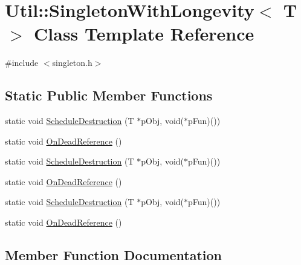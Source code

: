 \hypertarget{classUtil_1_1SingletonWithLongevity}{}\section{Util\+:\+:Singleton\+With\+Longevity$<$ T $>$ Class Template Reference}
\label{classUtil_1_1SingletonWithLongevity}


{\ttfamily \#include $<$singleton.\+h$>$}

\subsection*{Static Public Member Functions}
\begin{DoxyCompactItemize}
\item 
static void \mbox{\hyperlink{classUtil_1_1SingletonWithLongevity_acada28acaf9030754388818a79b0468d}{Schedule\+Destruction}} (T $\ast$p\+Obj, void($\ast$p\+Fun)())
\item 
static void \mbox{\hyperlink{classUtil_1_1SingletonWithLongevity_a8eafdc86338509e86107e686fc22cbed}{On\+Dead\+Reference}} ()
\item 
static void \mbox{\hyperlink{classUtil_1_1SingletonWithLongevity_acada28acaf9030754388818a79b0468d}{Schedule\+Destruction}} (T $\ast$p\+Obj, void($\ast$p\+Fun)())
\item 
static void \mbox{\hyperlink{classUtil_1_1SingletonWithLongevity_a8eafdc86338509e86107e686fc22cbed}{On\+Dead\+Reference}} ()
\item 
static void \mbox{\hyperlink{classUtil_1_1SingletonWithLongevity_acada28acaf9030754388818a79b0468d}{Schedule\+Destruction}} (T $\ast$p\+Obj, void($\ast$p\+Fun)())
\item 
static void \mbox{\hyperlink{classUtil_1_1SingletonWithLongevity_a8eafdc86338509e86107e686fc22cbed}{On\+Dead\+Reference}} ()
\end{DoxyCompactItemize}


\subsection{Member Function Documentation}
\mbox{\label{classUtil_1_1SingletonWithLongevity_a8eafdc86338509e86107e686fc22cbed}} 
